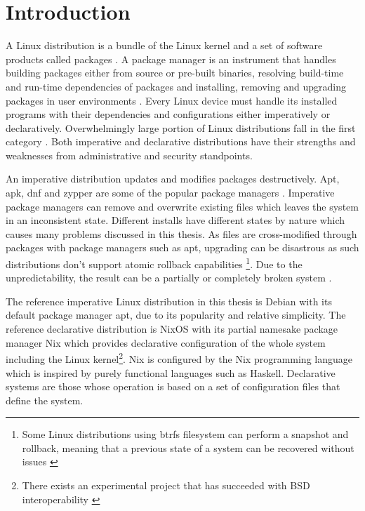 \chapter{Introduction} \label{johdanto}

A Linux distribution is a bundle of the Linux kernel and a set of
software products called packages \cite{gnuPackagesx2014}.  A package
manager is an instrument that handles building packages either
from source or pre-built binaries, resolving build-time and run-time
dependencies of packages and installing, removing and upgrading
packages in user environments \cite{gnuPackagesx2014}. Every Linux
device must handle its installed programs with their dependencies and
configurations either imperatively or declaratively. Overwhelmingly
large portion of Linux distributions fall in the first category
\cite{dolstra2008nixos}. Both imperative and declarative distributions
have their strengths and weaknesses from administrative and security
standpoints.

An imperative distribution updates and modifies packages destructively. Apt,
apk, dnf and zypper are some of the popular package managers \cite{dolstra2008nixos}. Imperative package
managers can remove and overwrite existing files which leaves the
system in an inconsistent state. Different installs have
different states by nature which causes many problems discussed in this
thesis. As files are cross-modified through packages with package
managers such as apt, upgrading can be disastrous as such distributions
don't support atomic rollback capabilities \footnote{Some Linux
distributions using btrfs filesystem can perform a snapshot and
rollback, meaning that a previous state of a system can be recovered without issues \cite{opensuseSystemRecovery}}. Due to the unpredictability,
the result can be a partially or completely broken system
\cite{dolstra2008nixos}.

The reference imperative Linux distribution in this thesis is Debian
with its default package manager apt, due to its popularity and
relative simplicity. The reference declarative distribution is NixOS
with its partial namesake package manager Nix which provides
declarative configuration of the whole system including the Linux
kernel\footnote{There exists an experimental project that has
succeeded with BSD interoperability
\cite{githubGitHubNixosbsdnixbsd}}. Nix is configured by the Nix
programming language which is inspired by purely functional languages
such as Haskell. Declarative systems are those whose operation is based on a set of configuration files that define the system. \cite{van2013reference}

